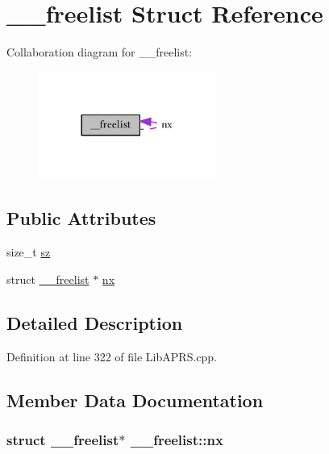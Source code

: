 \hypertarget{struct____freelist}{}\section{\+\_\+\+\_\+freelist Struct Reference}
\label{struct____freelist}


Collaboration diagram for \+\_\+\+\_\+freelist\+:
\nopagebreak
\begin{figure}[H]
\begin{center}
\leavevmode
\includegraphics[width=165pt]{struct____freelist__coll__graph}
\end{center}
\end{figure}
\subsection*{Public Attributes}
\begin{DoxyCompactItemize}
\item 
size\+\_\+t \hyperlink{struct____freelist_a400b91c9baf14861360a1c1caba8309d}{sz}
\item 
struct \hyperlink{struct____freelist}{\+\_\+\+\_\+freelist} $\ast$ \hyperlink{struct____freelist_abfcbc656d931bb3fc6f5b3f3deec41cd}{nx}
\end{DoxyCompactItemize}


\subsection{Detailed Description}


Definition at line 322 of file Lib\+A\+P\+R\+S.\+cpp.



\subsection{Member Data Documentation}
\subsubsection[{\texorpdfstring{nx}{nx}}]{\setlength{\rightskip}{0pt plus 5cm}struct {\bf \+\_\+\+\_\+freelist}$\ast$ \+\_\+\+\_\+freelist\+::nx}\hypertarget{struct____freelist_abfcbc656d931bb3fc6f5b3f3deec41cd}{}\label{struct____freelist_abfcbc656d931bb3fc6f5b3f3deec41cd}


